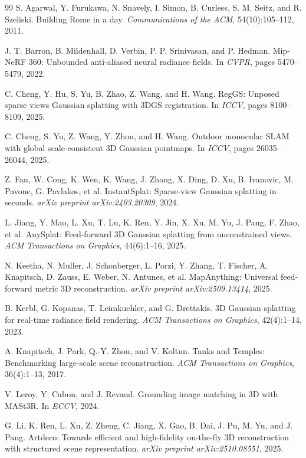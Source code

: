 \documentclass[10pt,twocolumn,letterpaper]{article}
\begin{document}
\begin{thebibliography}{99}
S. Agarwal, Y. Furukawa, N. Snavely, I. Simon, B. Curless, S. M. Seitz, and R. Szeliski.
Building Rome in a day.
\emph{Communications of the ACM}, 54(10):105--112, 2011.

J. T. Barron, B. Mildenhall, D. Verbin, P. P. Srinivasan, and P. Hedman.
Mip-NeRF 360: Unbounded anti-aliased neural radiance fields.
In \emph{CVPR}, pages 5470--5479, 2022.

C. Cheng, Y. Hu, S. Yu, B. Zhao, Z. Wang, and H. Wang.
RegGS: Unposed sparse views Gaussian splatting with 3DGS registration.
In \emph{ICCV}, pages 8100--8109, 2025.

C. Cheng, S. Yu, Z. Wang, Y. Zhou, and H. Wang.
Outdoor monocular SLAM with global scale-consistent 3D Gaussian pointmaps.
In \emph{ICCV}, pages 26035--26044, 2025.

Z. Fan, W. Cong, K. Wen, K. Wang, J. Zhang, X. Ding, D. Xu, B. Ivanovic, M. Pavone, G. Pavlakos, et al.
InstantSplat: Sparse-view Gaussian splatting in seconds.
\emph{arXiv preprint arXiv:2403.20309}, 2024.

L. Jiang, Y. Mao, L. Xu, T. Lu, K. Ren, Y. Jin, X. Xu, M. Yu, J. Pang, F. Zhao, et al.
AnySplat: Feed-forward 3D Gaussian splatting from unconstrained views.
\emph{ACM Transactions on Graphics}, 44(6):1--16, 2025.

N. Keetha, N. Muller, J. Schonberger, L. Porzi, Y. Zhang, T. Fischer, A. Knapitsch, D. Zauss, E. Weber, N. Antunes, et al.
MapAnything: Universal feed-forward metric 3D reconstruction.
\emph{arXiv preprint arXiv:2509.13414}, 2025.

B. Kerbl, G. Kopanas, T. Leimkuehler, and G. Drettakis.
3D Gaussian splatting for real-time radiance field rendering.
\emph{ACM Transactions on Graphics}, 42(4):1--14, 2023.

A. Knapitsch, J. Park, Q.-Y. Zhou, and V. Koltun.
Tanks and Temples: Benchmarking large-scale scene reconstruction.
\emph{ACM Transactions on Graphics}, 36(4):1--13, 2017.

V. Leroy, Y. Cabon, and J. Revaud.
Grounding image matching in 3D with MASt3R.
In \emph{ECCV}, 2024.

G. Li, K. Ren, L. Xu, Z. Zheng, C. Jiang, X. Gao, B. Dai, J. Pu, M. Yu, and J. Pang.
Artdeco: Towards efficient and high-fidelity on-the-fly 3D reconstruction with structured scene representation.
\emph{arXiv preprint arXiv:2510.08551}, 2025.


\end{thebibliography}
\end{document}

